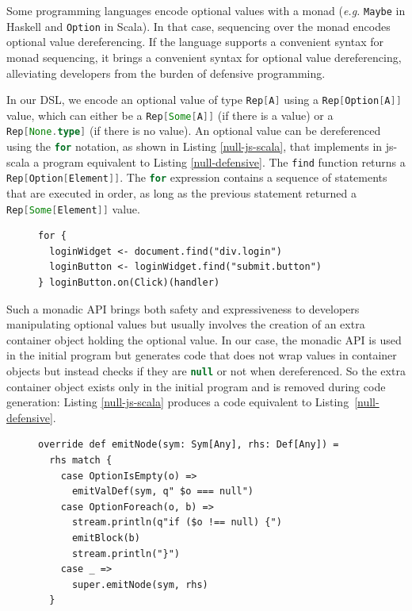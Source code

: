 \documentclass{llncs}
\newcommand{\code}[1]{\lstinline[language=Scala,columns=fixed,basicstyle=\footnotesize]|#1|}
\newcommand{\eg}{\emph{e.g.}}
\begin{document}
Some programming languages encode optional values with a monad (\eg{} \code{Maybe} in Haskell and
\code{Option} in Scala). In that case, sequencing over the monad encodes optional value
dereferencing. If the language supports a convenient syntax for monad sequencing, it brings a
convenient syntax for optional value dereferencing, alleviating developers from the burden of
defensive programming.

In our DSL, we encode an optional value of type \code{Rep[A]} using a \code{Rep[Option[A]]} value,
which can either be a \code{Rep[Some[A]]} (if there is a value) or a \code{Rep[None.type]} (if
there is no value). An optional value can be dereferenced using the \code{for} notation, as shown
in Listing \ref{null-js-scala}, that implements in js-scala a program equivalent to Listing
\ref{null-defensive}. The \code{find} function returns a \code{Rep[Option[Element]]}. The \code{for}
expression contains a sequence of statements that are executed in order, as long as the previous
statement returned a \code{Rep[Some[Element]]} value.

\begin{figure}[htb]
\begin{lstlisting}[label=null-js-scala,caption=Handling null references in js-scala]
for {
  loginWidget <- document.find("div.login")
  loginButton <- loginWidget.find("submit.button")
} loginButton.on(Click)(handler)
\end{lstlisting}
\end{figure}

Such a monadic API brings both safety and expressiveness to developers manipulating optional values
but usually involves the creation of an extra container object holding the optional value. In our
case, the monadic API is used in the initial program but generates code that does not wrap values in
container objects but instead checks if they are \code{null} or not when dereferenced. So the extra
container object exists only in the initial program and is removed during code generation: Listing
\ref{null-js-scala} produces a code equivalent to Listing~\ref{null-defensive}.

\begin{figure}[htb]
\begin{lstlisting}[caption=JavaScript code generator for null references handling
DSL,label=option-codegen,captionpos=b]
override def emitNode(sym: Sym[Any], rhs: Def[Any]) =
  rhs match {
    case OptionIsEmpty(o) =>
      emitValDef(sym, q" $o === null")
    case OptionForeach(o, b) =>
      stream.println(q"if ($o !== null) {")
      emitBlock(b)
      stream.println("}")
    case _ =>
      super.emitNode(sym, rhs)
  }
\end{lstlisting}
\end{figure}
\end{document}
